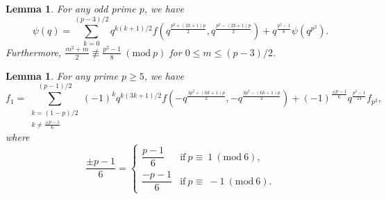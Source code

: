 \documentclass[12pt]{amsart}
\theoremstyle{plain}
\newtheorem{lemma}[theorem]{Lemma}
\theoremstyle{definition}
\begin{document}
\begin{lemma}\cite[Thm. 2.1]{CuiGu2013} \label{psidissectionlemma} For any odd prime $p$, we have
\begin{equation}
\psi(q)= \sum_{k=0}^{(p-3)/2} q^{k(k+1)/2} f(q^{\frac{p^{2}+(2k+1)p}{2}}, q^{\frac{p^{2}-(2k+1)p}{2}})+ q^{\frac{p^{2}-1}{8}}\psi(q^{p^{2}}).
 \label{psidissection}
\end{equation}
Furthermore, $\frac{m^{2}+m}{2}\not\equiv\frac{p^{2}-1}{8} \ (\mathrm{mod} \ p)$ for $0 \leq m \leq (p-3)/2$.
\end{lemma}

\begin{lemma}\cite[Thm. 2.2]{CuiGu2013} \label{fdissectionlemma} For any prime $p\geq 5$, we have
\begin{equation}
f_{1}= \sum_{\substack{k = (1-p)/2 \\ k\neq \frac{\pm p-1}{6}} }^{(p-1)/2} (-1)^{k} q^{k(3k+1)/2} f(-q^{\frac{3p^{2}+(6k+1)p}{2}}, -q^{\frac{3p^{2}-(6k+1)p}{2}})+(-1)^{\frac{\pm p-1}{6}} q^{\frac{p^{2}-1}{24}}f_{p^{2}},
 \label{fdissection}
\end{equation}
where 
\[
   	\dfrac{\pm p-1}{6}=
    \begin{cases}
        \dfrac{p-1}{6} & \text{if} \  p \equiv \ 1 \ (\mathrm{mod} \ 6), \\
      	\dfrac{-p-1}{6} & \text{if} \  p \equiv \ -1 \ (\mathrm{mod} \ 6).
    \end{cases}
\]
\end{lemma}
\end{document}
